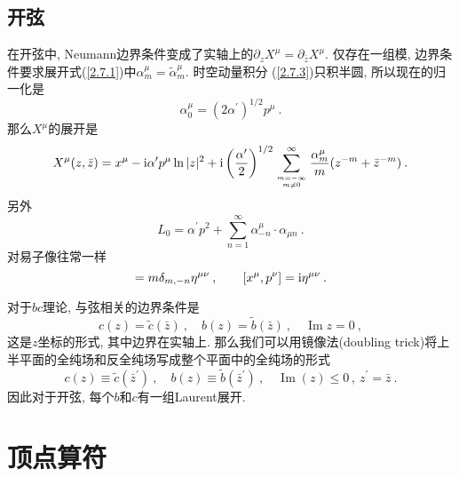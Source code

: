 \subsection*{ 开弦}
在开弦中, Neumann边界条件变成了实轴上的$\partial_z X^{\mu}=\partial_{\bar{z}} X^{\mu}$.
仅存在一组模, 边界条件要求展开式(\ref{2.7.1})中$\alpha_{m}^{\mu}=\tilde{\alpha}_{m}^{\mu}$. 时空动量积分 (\ref{2.7.3})只积半圆, 所以现在的归一化是
\begin{equation}
\alpha_{0}^{\mu}= (2 \alpha^{\prime})^{1 / 2} p^{\mu} \:. \label{2.7.25}
\end{equation}
那么$X^\mu$的展开是
\begin{equation}
X^{\mu}(z, \bar{z})=x^{\mu}- \mathrm{i} \alpha^{\prime} p^{\mu} \ln |z|^{2} + \mathrm{i}\left(\frac{\alpha^{\prime}}{2}\right)^{1 / 2} 
\sum_{m=-\infty \atop m \neq 0}^{\infty} \frac{\alpha_{m}^{\mu}}{m} (z^{-m}+\bar{z}^{-m}) \:. \label{2.7.26}
\end{equation}
另外
\begin{equation}
L_{0}=\alpha^{\prime} p^{2}+\sum_{n=1}^{\infty} \alpha_{-n}^{\mu}\cdot \alpha_{\mu n} \:. \label{2.7.27}
\end{equation}
对易子像往常一样
\begin{equation}
[\alpha_{m}^{\mu}, \alpha_{n}^{\nu}]=m \delta_{m,-n} \eta^{\mu \nu} \: , \qquad [x^{\mu}, p^{\nu}]= \mi \eta^{\mu \nu} \:. \label{2.7.28}
\end{equation}

对于$bc$理论, 与弦相关的边界条件是
\begin{equation}
c(z)=\tilde{c}(\bar{z})\: , \quad b(z)=\tilde{b}(\bar{z}) \:, \quad \operatorname{Im} z=0 \:,  \label{2.7.29}
\end{equation}
这是$z$坐标的形式, 其中边界在实轴上. 那么我们可以用镜像法(doubling trick)将上半平面的全纯场和反全纯场写成整个平面中的全纯场的形式
\begin{equation}
c(z) \equiv \tilde{c}(\bar{z}^{\prime})\:, \quad b(z) \equiv \tilde{b}(\bar{z}^{\prime})\:, \quad \operatorname{Im}(z) \leq 0\,,\: z^{\prime}=\bar{ z} \:.  \label{2.7.30}
\end{equation}
因此对于开弦, 每个$b$和$c$有一组Laurent展开.

\section{\texorpdfstring{顶点算符}{2.8 Vertex operators}}


